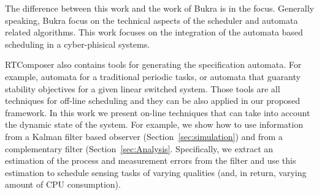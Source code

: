 \documentclass[ twoside, 12pt ]{article}
\begin{document}
The difference between this work and the work of Bukra is in the focus. Generally speaking, Bukra focus on the technical aspects of the scheduler and automata related algorithms.
This work focuses on the integration of the automata based scheduling in a cyber-phisical systems.

RTComposer also contains tools for generating the specification automata. For example, automata for a traditional periodic tasks, or automata that guaranty stability objectives for a given linear switched system. Those tools are all techniques for off-line scheduling and they can be also applied in our proposed framework.
In this work we present on-line techniques that can take into account the dynamic state of the system.
For example, we show how to use information from a Kalman filter based observer (Section~\ref{sec:simulation}) and from a complementary filter (Section~\ref{sec:Analysis}.
Specifically, we extract an estimation of the process and measurement errors from the filter and use this estimation to schedule sensing tasks of varying qualities (and, in return, varying amount of CPU consumption).



\end{document}
